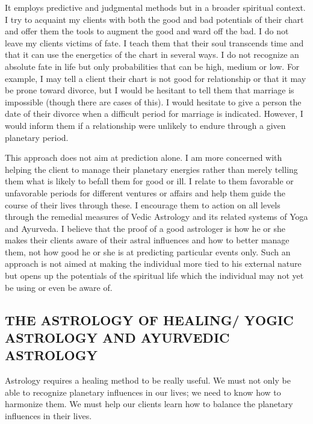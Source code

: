  

It employs predictive and judgmental methods but in a broader spiritual context. I try to acquaint my clients with both the good and bad potentials of their chart and offer them the tools to augment the good and ward off the bad. I do not leave my clients victims of fate. I teach them that their soul transcends time and that it can use the energetics of the chart in several ways. I do not recognize an absolute fate in life but only probabilities that can be high, medium or low.  For example, I may tell a client their chart is not good for relationship or that it may be prone toward divorce, but I would be hesitant to tell them that marriage is impossible (though there are cases of this). I would hesitate to give a person the date of their divorce when a difficult period for marriage is indicated. However, I would inform them if a relationship were unlikely to endure through a given planetary period.

 

This approach does not aim at prediction alone. I am more concerned with helping the client to manage their planetary energies rather than merely telling them what is likely to befall them for good or ill. I relate to them favorable or unfavorable periods for different ventures or affairs and help them guide the course of their lives through these. I encourage them to action on all levels through the remedial measures of Vedic Astrology and its related systems of Yoga and Ayurveda. I believe that the proof of a good astrologer is how he or she makes their clients aware of their astral influences and how to better manage them, not how good he or she is at predicting particular events only. Such an approach is not aimed at making the individual more tied to his external nature but opens up the potentials of the spiritual life which the individual may not yet be using or even be aware of.

 

\subsection{THE ASTROLOGY OF HEALING/ YOGIC ASTROLOGY AND AYURVEDIC ASTROLOGY}

 

Astrology requires a healing method to be really useful. We must not only be able to recognize planetary influences in our lives; we need to know how to harmonize them. We must help our clients learn how to balance the planetary influences in their lives.

